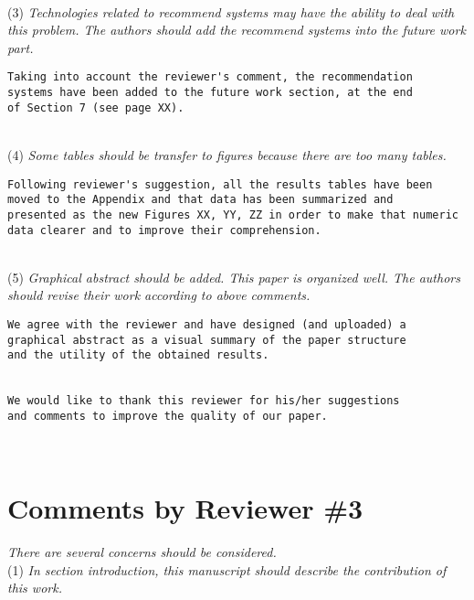 \documentclass[preprint]{elsarticle}
\begin{document}
~\\
\noindent (3) \emph{Technologies related to recommend systems may have the ability to deal with this problem. The authors should add the recommend systems into the future work part. } 

\begin{verbatim}
Taking into account the reviewer's comment, the recommendation 
systems have been added to the future work section, at the end 
of Section 7 (see page XX).
\end{verbatim}


~\\
\noindent (4) \emph{Some tables should be transfer to figures because there are too many tables. } 

\begin{verbatim}
Following reviewer's suggestion, all the results tables have been 
moved to the Appendix and that data has been summarized and 
presented as the new Figures XX, YY, ZZ in order to make that numeric 
data clearer and to improve their comprehension.
\end{verbatim}


~\\
\noindent (5) \emph{Graphical abstract should be added. This paper is organized well. The authors should revise their work according to above comments. } 

\begin{verbatim}
We agree with the reviewer and have designed (and uploaded) a 
graphical abstract as a visual summary of the paper structure 
and the utility of the obtained results.


We would like to thank this reviewer for his/her suggestions 
and comments to improve the quality of our paper.
\end{verbatim}

~\\


\section{Comments by Reviewer \#3}

\noindent \emph{There are several concerns should be considered.}\\

\noindent (1) \emph{In section introduction, this manuscript should describe the contribution of this work. } 
\end{document}
